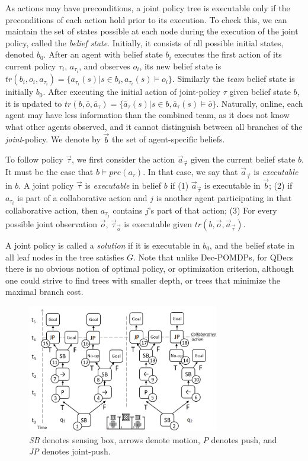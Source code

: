 \documentclass[letterpaper]{article}
\theoremstyle{definition}
\begin{document}
As actions may have preconditions, a joint policy tree is executable only if the preconditions of each action hold prior to its execution. To check this, we can maintain the set of states possible at each node during the execution of the joint policy, called the
\emph{belief state}. Initially, it consists of all possible initial states, denoted $b_0$.
After an agent with belief state $b_i$ executes the first action of its current policy $\tau_i$, $a_{\tau_i}$, and observes ${o_i}$, its new belief state is
$tr(b_i,o_i,{a}_{\tau_i}) = \{a_{\tau_i}(s) | s\in b_i, a_{\tau_i}(s)\models o_i\}$.
Similarly the {\em team} belief state is
initially $b_0$. After executing the initial action of joint-policy $\tau$ given belief state $b$, it is updated to
$tr(b,\bar{o},\bar{a}_{\tau}) = \{\bar{a}_{\tau}(s) | s\in b, \bar{a}_{\tau}(s)\models \bar{o}\}$.
Naturally,
online, each agent may have less information than the combined team, as it does not know what other agents observed, and it cannot distinguish between all branches of the {\em joint}-policy. We denote by $\vec{b}$ the set of agent-specific beliefs.

To follow policy $\vec{\tau}$, we first consider the action $\vec{a}_{\vec{\tau}}$ given the current belief state $b$. It must be the case that
$b \models pre(a_{\tau})$. In that case, we say that  $\vec{a}_{\vec{\tau}}$ is {\em executable} in $b$.
A  joint policy  $\vec{\tau}$ is {\em executable} in belief  $b$ if (1) $\vec{a}_{\vec{\tau}}$ is executable in $\vec{b}$;  (2) if $a_{\tau_i}$ is  part of a collaborative action and $j$ is another agent participating in that collaborative action, then $a_{\tau_j}$ contains $j$'s part of that action;
(3) For every possible joint observation $\vec{o}$,    $\vec{\tau}_{\vec{o}}$ is executable given $tr(b,\vec{o},\vec{a}_{\vec{\tau}})$.

A joint policy is called a {\em solution} if it is executable in $b_0$, and the belief state in all leaf nodes in the tree satisfies $G$.
Note that unlike Dec-POMDPs, for QDecs there is no obvious notion of optimal policy, or optimization criterion, although one could strive to find trees with smaller depth, or trees that minimize the maximal branch cost.

\begin{figure}[t]
\centering
\includegraphics[width=3.3in]{LocalTrees.png}
\caption{\emph{SB} denotes sensing box, arrows denote motion, {\em P} denotes push,
and \emph{JP} denotes joint-push.
}
\label{fig:LocalTrees}
\end{figure}
\end{document}
